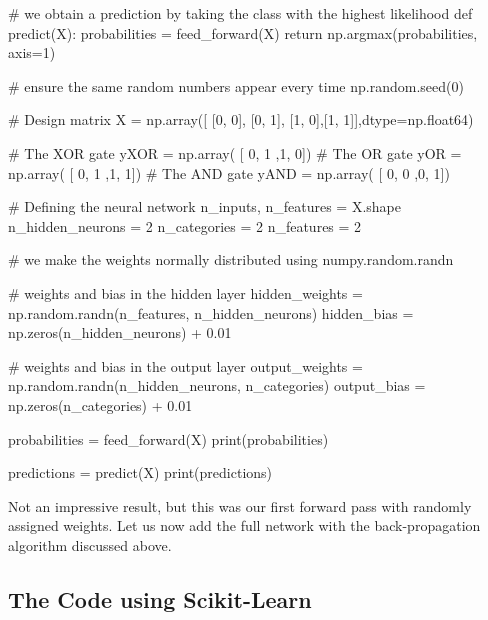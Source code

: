 \documentclass[%
oneside,                 %
final,                   %
10pt]{article}
\begin{document}
# we obtain a prediction by taking the class with the highest likelihood
def predict(X):
    probabilities = feed_forward(X)
    return np.argmax(probabilities, axis=1)

# ensure the same random numbers appear every time
np.random.seed(0)

# Design matrix
X = np.array([ [0, 0], [0, 1], [1, 0],[1, 1]],dtype=np.float64)

# The XOR gate
yXOR = np.array( [ 0, 1 ,1, 0])
# The OR gate
yOR = np.array( [ 0, 1 ,1, 1])
# The AND gate
yAND = np.array( [ 0, 0 ,0, 1])

# Defining the neural network
n_inputs, n_features = X.shape
n_hidden_neurons = 2
n_categories = 2
n_features = 2

# we make the weights normally distributed using numpy.random.randn

# weights and bias in the hidden layer
hidden_weights = np.random.randn(n_features, n_hidden_neurons)
hidden_bias = np.zeros(n_hidden_neurons) + 0.01

# weights and bias in the output layer
output_weights = np.random.randn(n_hidden_neurons, n_categories)
output_bias = np.zeros(n_categories) + 0.01

probabilities = feed_forward(X)
print(probabilities)


predictions = predict(X)
print(predictions)


\epycod


Not an impressive result, but this was our first forward pass with randomly assigned weights. Let us now add the full network with the back-propagation algorithm discussed above.

\subsection{The Code using Scikit-Learn}
\end{document}
